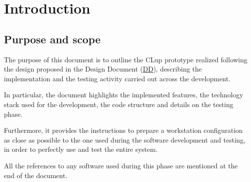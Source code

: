 \documentclass[a4paper,oneside,11pt]{book}
\begin{document}

\tableofcontents
\newpage
{}

\chapter{Introduction}
    \section{Purpose and scope}
    The purpose of this document is to outline the CLup prototype realized following the design proposed in the Design Document (\href{run:../DeliveryFolder/DD2.pdf}{DD}), describing the implementation and the testing activity carried out across the development. \par
    In particular, the document highlights the implemented features, the technology stack used for the development, the code structure and details on the testing phase. \par
    Furthermore, it provides the instructions to prepare a workstation configuration as close as possible to the one used during the software development and testing, in order to perfectly use and test the entire system. \par
    All the references to any software used during this phase are mentioned at the end of the document.
\end{document}
